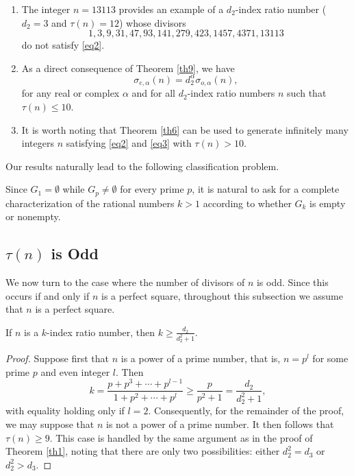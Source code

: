 \documentclass[12pt,reqno]{article}
\begin{document}
\begin{remark}
\begin{enumerate}
\item The integer $n=13113$ provides an example of a $d_2$-index ratio number ($d_2=3$ and $\tau(n)=12$) whose divisors
$$
1, 3, 9, 31, 47, 93, 141, 279, 423, 1457, 4371, 13113
$$
do not satisfy \eqref{eq2}.
\item As a direct consequence of Theorem \ref{th9}, we have
\begin{equation}\label{eq3}
\sigma_{e,\alpha}(n) = d_2^\alpha \sigma_{o,\alpha}(n),
\end{equation}
for any real or complex \( \alpha \) and for all \( d_2 \)-index ratio numbers $n$ such that \( \tau(n) \leq 10 \).
\item It is worth noting that Theorem \ref{th6} can be used to generate infinitely many integers $n$
satisfying \eqref{eq2} and \eqref{eq3} with \( \tau(n) > 10 \).
\end{enumerate}
\end{remark}

Our results naturally lead to the following classification problem.
\begin{problem}
Since \(G_1=\emptyset\) while \(G_p\neq\emptyset\) for every prime \(p\), it is natural to ask for a complete characterization of the rational numbers \(k>1\) according to whether \(G_k\) is empty or nonempty.
\end{problem}


\subsection{\texorpdfstring{$\tau(n)$ is Odd}{}}
We now turn to the case where the number of divisors of \(n\) is odd. Since this occurs if and only if \(n\) is a perfect square, throughout this subsection we assume that \(n\) is a perfect square.
\begin{theorem}\label{th13}
If $n$ is a $k$-index ratio number, then $k\geq\frac{d_2}{d_2^2+1}$.
\end{theorem}

\begin{proof}
Suppose first that \( n \) is a power of a prime number, that is, \( n = p^l \) for some prime $p$ and even integer $l$. Then  
$$
k = \dfrac{p+p^3+\cdots+p^{l-1}}{1+p^2+\cdots+p^l}\geq\frac{p}{p^2+1}=\frac{d_2}{d_2^2+1}, 
$$
with equality holding only if $l=2$. Consequently, for the remainder of the proof, we may suppose that \( n \) is not a power of a prime number. It then follows that $\tau(n)\geq 9$.
This case is handled by the same argument as in the proof of Theorem \ref{th1}, noting that there are only two possibilities: either \( d_2^2 = d_3 \) or \( d_2^2 > d_3 \).
\end{proof}
\end{document}
